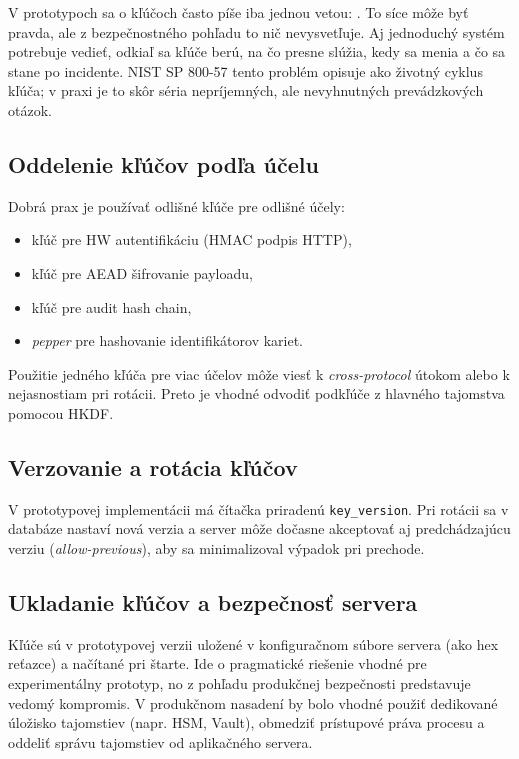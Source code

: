 \documentclass[journal,a4paper,onecolumn]{IEEEtran}
\begin{document}
V prototypoch sa o kľúčoch často píše iba jednou vetou: . To síce môže byť pravda, ale z bezpečnostného pohľadu to nič nevysvetľuje. Aj jednoduchý systém potrebuje vedieť, odkiaľ sa kľúče berú, na čo presne slúžia, kedy sa menia a čo sa stane po incidente. NIST SP 800-57 tento problém opisuje ako životný cyklus kľúča\cite{NIST80057}; v praxi je to skôr séria nepríjemných, ale nevyhnutných prevádzkových otázok.

\subsection{Oddelenie kľúčov podľa účelu}

Dobrá prax je používať odlišné kľúče pre odlišné účely:

\begin{itemize}[leftmargin=*,itemsep=2pt]
  \item kľúč pre HW autentifikáciu (HMAC podpis HTTP),
  \item kľúč pre AEAD šifrovanie payloadu,
  \item kľúč pre audit hash chain,
  \item \emph{pepper} pre hashovanie identifikátorov kariet.
\end{itemize}

Použitie jedného kľúča pre viac účelov môže viesť k \emph{cross-protocol} útokom alebo k nejasnostiam pri rotácii. Preto je vhodné odvodiť podkľúče z hlavného tajomstva pomocou HKDF\cite{RFC5869}.

\subsection{Verzovanie a rotácia kľúčov}

V prototypovej implementácii má čítačka priradenú \texttt{key\_version}. Pri rotácii sa v databáze nastaví nová verzia a server môže dočasne akceptovať aj predchádzajúcu verziu (\emph{allow-previous}), aby sa minimalizoval výpadok pri prechode.

\subsection{Ukladanie kľúčov a bezpečnosť servera}

Kľúče sú v prototypovej verzii uložené v konfiguračnom súbore servera (ako hex reťazce) a načítané pri štarte. Ide o pragmatické riešenie vhodné pre experimentálny prototyp, no z pohľadu produkčnej bezpečnosti predstavuje vedomý kompromis. V produkčnom nasadení by bolo vhodné použiť dedikované úložisko tajomstiev (napr. HSM, Vault), obmedziť prístupové práva procesu a oddeliť správu tajomstiev od aplikačného servera.
\end{document}
